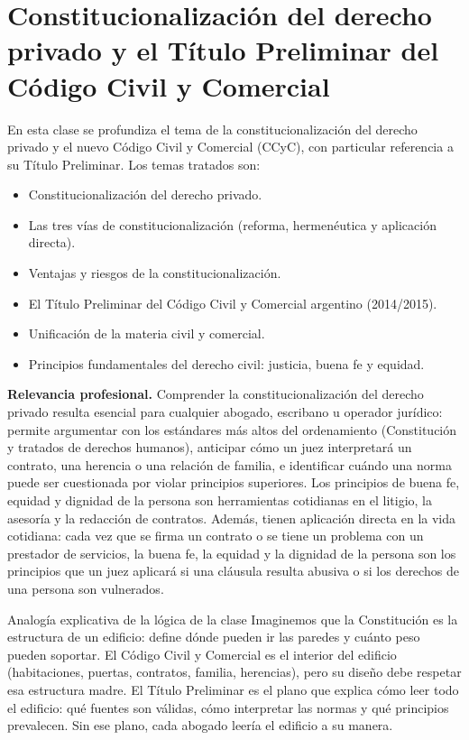 \documentclass[12pt,oneside]{book}
\begin{document}
\chapter{Constitucionalización del derecho privado y el Título Preliminar del Código Civil y Comercial}

En esta clase se profundiza el tema de la constitucionalización del derecho privado y el nuevo Código Civil y Comercial (CCyC), con particular referencia a su Título Preliminar. Los temas tratados son:

\begin{itemize}
    \item Constitucionalización del derecho privado.
    \item Las tres vías de constitucionalización (reforma, hermenéutica y aplicación directa).
    \item Ventajas y riesgos de la constitucionalización.
    \item El Título Preliminar del Código Civil y Comercial argentino (2014/2015).
    \item Unificación de la materia civil y comercial.
    \item Principios fundamentales del derecho civil: justicia, buena fe y equidad.
\end{itemize}

\begin{note}
\textbf{Relevancia profesional.} Comprender la constitucionalización del derecho privado resulta esencial para cualquier abogado, escribano u operador jurídico: permite argumentar con los estándares más altos del ordenamiento (Constitución y tratados de derechos humanos), anticipar cómo un juez interpretará un contrato, una herencia o una relación de familia, e identificar cuándo una norma puede ser cuestionada por violar principios superiores. Los principios de buena fe, equidad y dignidad de la persona son herramientas cotidianas en el litigio, la asesoría y la redacción de contratos. Además, tienen aplicación directa en la vida cotidiana: cada vez que se firma un contrato o se tiene un problema con un prestador de servicios, la buena fe, la equidad y la dignidad de la persona son los principios que un juez aplicará si una cláusula resulta abusiva o si los derechos de una persona son vulnerados.
\end{note}

\begin{example}{Analogía explicativa de la lógica de la clase}
Imaginemos que la Constitución es la estructura de un edificio: define dónde pueden ir las paredes y cuánto peso pueden soportar. El Código Civil y Comercial es el interior del edificio (habitaciones, puertas, contratos, familia, herencias), pero su diseño debe respetar esa estructura madre. El Título Preliminar es el plano que explica cómo leer todo el edificio: qué fuentes son válidas, cómo interpretar las normas y qué principios prevalecen. Sin ese plano, cada abogado leería el edificio a su manera.
\end{example}
\end{document}
